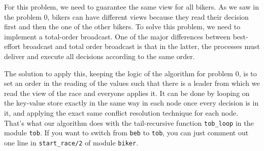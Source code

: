 \documentclass{article}
\begin{document}
For this problem, we need to guarantee the same view for all bikers. As we saw
in the problem 0, bikers can have different views because they read their decision
first and then the one of the other bikers. To solve this problem, we need to
implement a total-order broadcast. One of the major
differences between best-effort broadcast and total order broadcast is that in
the latter, the processes must deliver and execute all decisions according to
the same order. \newline

The solution to apply this, keeping the logic of the algorithm for problem 0, is
to set an order in the reading of the values such that there is a leader from
which we read the view of the race and everyone applies it. It can be done by
looping on the key-value store exactly in the same way in each node once every
decision is in it, and applying the exact same conflict resolution technique
for each node. That's what our algorithm does with the tail-recursive function
\verb#tob_loop# in the module \verb#tob#. If you want to switch from \verb#beb#
to \verb#tob#, you can just comment out one line in \verb#start_race/2# of module
\verb#biker#.
\end{document}
